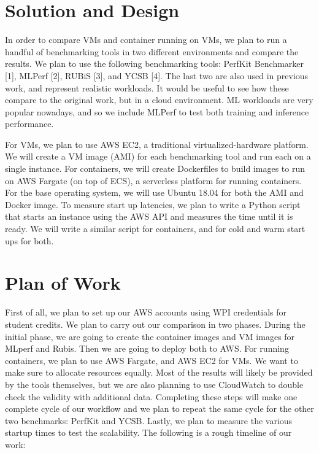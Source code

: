 \documentclass[11pt]{article}
\begin{document}
\section{Solution and Design}

In order to compare VMs and container running on VMs, we plan to run a handful of benchmarking tools in two different environments and compare the results. We plan to use the following benchmarking tools: PerfKit Benchmarker [1], MLPerf [2], RUBiS [3], and YCSB [4]. The last two are also used in previous work, and represent realistic workloads. It would be useful to see how these compare to the original work, but in a cloud environment. ML workloads are very popular nowadays, and so we include MLPerf to test both training and inference performance.

For VMs, we plan to use AWS EC2, a traditional virtualized-hardware platform. We will create a VM image (AMI) for each benchmarking tool and run each on a single instance.  For containers, we will create Dockerfiles to build images to run on AWS Fargate (on top of ECS), a serverless platform for running containers. For the base operating system, we will use Ubuntu 18.04 for both the AMI and Docker image. To measure start up latencies, we plan to write a Python script that starts an instance using the AWS API and measures the time until it is ready. We will write a similar script for containers, and for cold and warm start ups for both.

\section{Plan of Work}


First of all, we plan to set up our AWS accounts using WPI credentials for student credits. We plan to carry out our comparison in two phases. During the initial phase, we are going to create the container images and VM images for MLperf and Rubis. Then we are going to deploy both to AWS. For running containers, we plan to use AWS Fargate, and AWS EC2 for VMs. We want to make sure to allocate resources equally. Most of the results will likely be provided by the tools themselves, but we are also planning to use CloudWatch to double check the validity with additional data. Completing these steps will make one complete cycle of our workflow and we plan to repeat the same cycle for the other two benchmarks: PerfKit and YCSB. Lastly, we plan to measure the various startup times to test the scalability. The following is a rough timeline of our work:
\end{document}
